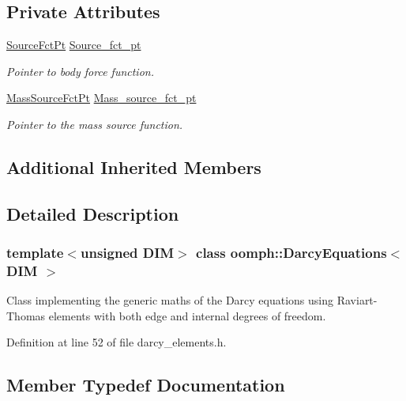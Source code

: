 \subsection*{Private Attributes}
\begin{DoxyCompactItemize}
\item 
\hyperlink{classoomph_1_1DarcyEquations_adcf88d9573b0f1c1988bdae6234eb7f8}{Source\+Fct\+Pt} \hyperlink{classoomph_1_1DarcyEquations_a42775534745602bbfb1b926873f3ff94}{Source\+\_\+fct\+\_\+pt}
\begin{DoxyCompactList}\small\item\em Pointer to body force function. \end{DoxyCompactList}\item 
\hyperlink{classoomph_1_1DarcyEquations_abb20685508a2704d195f3b8e124d20b4}{Mass\+Source\+Fct\+Pt} \hyperlink{classoomph_1_1DarcyEquations_a0e5ac119c2ce542c57852901d0bf227c}{Mass\+\_\+source\+\_\+fct\+\_\+pt}
\begin{DoxyCompactList}\small\item\em Pointer to the mass source function. \end{DoxyCompactList}\end{DoxyCompactItemize}
\subsection*{Additional Inherited Members}


\subsection{Detailed Description}
\subsubsection*{template$<$unsigned D\+IM$>$\newline
class oomph\+::\+Darcy\+Equations$<$ D\+I\+M $>$}

Class implementing the generic maths of the Darcy equations using Raviart-\/\+Thomas elements with both edge and internal degrees of freedom. 

Definition at line 52 of file darcy\+\_\+elements.\+h.



\subsection{Member Typedef Documentation}
\mbox{\label{classoomph_1_1DarcyEquations_abb20685508a2704d195f3b8e124d20b4}} 
